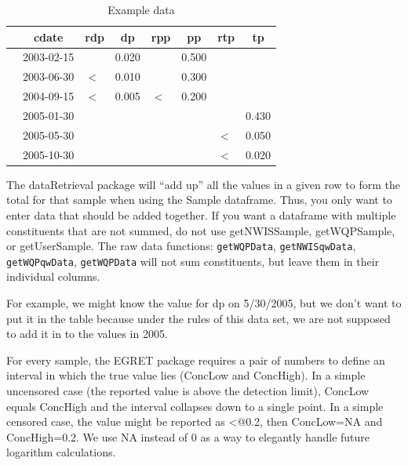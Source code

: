 \documentclass[a4paper,11pt]{article}\usepackage[]{graphicx}\usepackage[]{color}
\begin{document}
\begin{table}[ht]
\caption{Example data} 
\label{tab:exampleComplexQW}
{\footnotesize
\begin{tabular}{rllrlrlr}
  \hline
 & \multicolumn{1}{c}{\textbf{\textsf{cdate}}} & \multicolumn{1}{c}{\textbf{\textsf{rdp}}} & \multicolumn{1}{c}{\textbf{\textsf{dp}}} & \multicolumn{1}{c}{\textbf{\textsf{rpp}}} & \multicolumn{1}{c}{\textbf{\textsf{pp}}} & \multicolumn{1}{c}{\textbf{\textsf{rtp}}} & \multicolumn{1}{c}{\textbf{\textsf{tp}}} \\ 
  \hline
 & 2003-02-15 &  & 0.020 &  & 0.500 &  &  \\ 
  [5pt] & 2003-06-30 & $<$ & 0.010 &  & 0.300 &  &  \\ 
  [5pt] & 2004-09-15 & $<$ & 0.005 & $<$ & 0.200 &  &  \\ 
  [5pt] & 2005-01-30 &  &  &  &  &  & 0.430 \\ 
  [5pt] & 2005-05-30 &  &  &  &  & $<$ & 0.050 \\ 
  [5pt] & 2005-10-30 &  &  &  &  & $<$ & 0.020 \\ 
   \hline
\end{tabular}
}
\end{table}


The dataRetrieval package will \enquote{add up} all the values in a given row to form the total for that sample when using the Sample dataframe. Thus, you only want to enter data that should be added together. If you want a dataframe with multiple constituents that are not summed, do not use getNWISSample, getWQPSample, or getUserSample. The raw data functions: \texttt{getWQPData}, \texttt{getNWISqwData}, \texttt{getWQPqwData}, \texttt{getWQPData} will not sum constituents, but leave them in their individual columns. 

For example, we might know the value for dp on 5/30/2005, but we don't want to put it in the table because under the rules of this data set, we are not supposed to add it in to the values in 2005.

For every sample, the EGRET package requires a pair of numbers to define an interval in which the true value lies (ConcLow and ConcHigh). In a simple uncensored case (the reported value is above the detection limit), ConcLow equals ConcHigh and the interval collapses down to a single point. In a simple censored case, the value might be reported as \verb@<@0.2, then ConcLow=NA and ConcHigh=0.2. We use NA instead of 0 as a way to elegantly handle future logarithm calculations.
\end{document}
